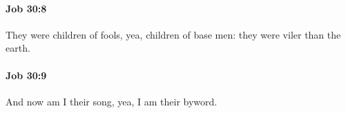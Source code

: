 		\paragraph{Job 30:8} %
			\label{JOB-30-8}

			They were children of fools, yea, children of base men: they were viler than the earth.


		\paragraph{Job 30:9} %
			\label{JOB-30-9}

			And now am I their song, yea, I am their byword.


